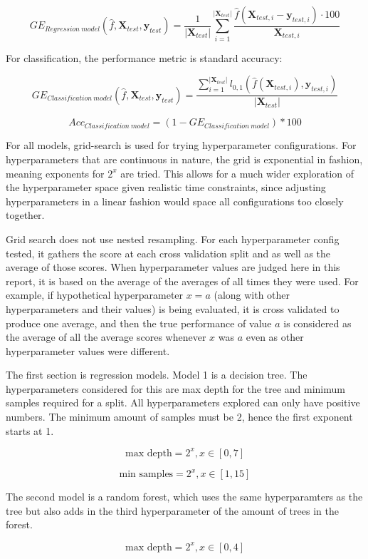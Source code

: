 \documentclass[12pt, letterpaper]{article}
\begin{document}
$$
    GE_{Regression\ model}(\hat{f}, \bm{X}_{test}, \bm{y}_{test}) = \frac{1}{|\bm{X}_{test}|} \sum_{i=1}^{|\bm{X}_{test}|} \frac{\hat{f}(\bm{X}_{test,i} - \bm{y}_{test,i}) \cdot 100}{\bm{X}_{test,i}}
$$

For classification, the performance metric is standard accuracy:

$$
    GE_{Classification\ model}(\hat{f}, \bm{X}_{test}, \bm{y}_{test}) = \frac{\sum_{i=1}^{|\bm{X}_{test}|}l_{0,1}(\hat{f}(\bm{X}_{test,i}), \bm{y}_{test,i})}{|\bm{X}_{test}|}
$$

$$
Acc_{Classification\ model} = (1 - GE_{Classification\ model}) * 100
$$

For all models, grid-search is used for trying hyperparameter configurations. For hyperparameters that are continuous in nature, the grid is exponential in fashion, meaning exponents for $2^x$ are tried. This allows for a much wider exploration of the hyperparameter space given realistic time constraints, since adjusting hyperparameters in a linear fashion would space all configurations too closely together.

Grid search does not use nested resampling. For each hyperparameter config tested, it gathers the score at each cross validation split and as well as the average of those scores. When hyperparameter values are judged here in this report, it is based on the average of the averages of all times they were used. For example, if hypothetical hyperparameter $x = a$ (along with other hyperparameters and their values) is being evaluated, it is cross validated to produce one average, and then the true performance of value $a$ is considered as the average of all the average scores whenever $x$ was $a$ even as other hyperparameter values were different.

The first section is regression models. Model 1 is a decision tree. The hyperparameters considered for this are max depth for the tree and minimum samples required for a split. All hyperparameters explored can only have positive numbers. The minimum amount of samples must be 2, hence the first exponent starts at 1.

$$
\text{max depth} = 2^x, x \in [0,7]
$$

$$
\text{min samples} = 2^x, x \in [1,15]
$$

The second model is a random forest, which uses the same hyperparamters as the tree but also adds in the third hyperparameter of the amount of trees in the forest.

$$
\text{max depth} = 2^x, x \in [0,4]
$$
\end{document}

